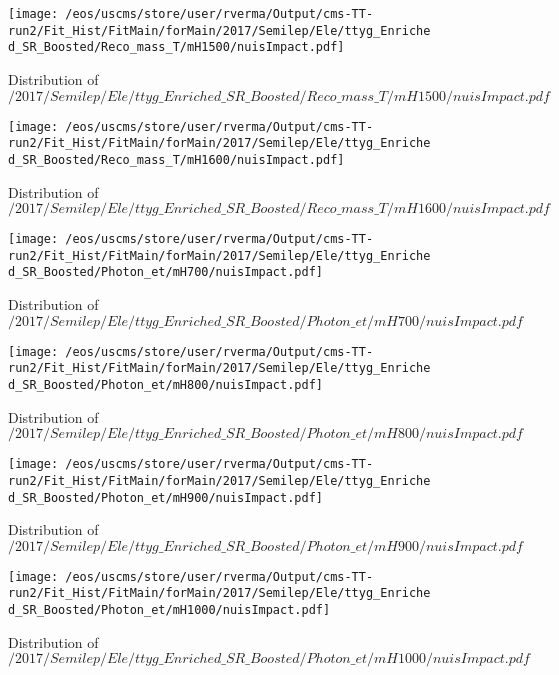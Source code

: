 \begin{figure}
\centering
\texttt{[image: /eos/uscms/store/user/rverma/Output/cms-TT-run2/Fit\_Hist/FitMain/forMain/2017/Semilep/Ele/ttyg\_Enriched\_SR\_Boosted/Reco\_mass\_T/mH1500/nuisImpact.pdf]}
\caption{Distribution of $/2017/Semilep/Ele/ttyg\_Enriched\_SR\_Boosted/Reco\_mass\_T/mH1500/nuisImpact.pdf$}
\end{figure}

\begin{figure}
\centering
\texttt{[image: /eos/uscms/store/user/rverma/Output/cms-TT-run2/Fit\_Hist/FitMain/forMain/2017/Semilep/Ele/ttyg\_Enriched\_SR\_Boosted/Reco\_mass\_T/mH1600/nuisImpact.pdf]}
\caption{Distribution of $/2017/Semilep/Ele/ttyg\_Enriched\_SR\_Boosted/Reco\_mass\_T/mH1600/nuisImpact.pdf$}
\end{figure}

\begin{figure}
\centering
\texttt{[image: /eos/uscms/store/user/rverma/Output/cms-TT-run2/Fit\_Hist/FitMain/forMain/2017/Semilep/Ele/ttyg\_Enriched\_SR\_Boosted/Photon\_et/mH700/nuisImpact.pdf]}
\caption{Distribution of $/2017/Semilep/Ele/ttyg\_Enriched\_SR\_Boosted/Photon\_et/mH700/nuisImpact.pdf$}
\end{figure}

\begin{figure}
\centering
\texttt{[image: /eos/uscms/store/user/rverma/Output/cms-TT-run2/Fit\_Hist/FitMain/forMain/2017/Semilep/Ele/ttyg\_Enriched\_SR\_Boosted/Photon\_et/mH800/nuisImpact.pdf]}
\caption{Distribution of $/2017/Semilep/Ele/ttyg\_Enriched\_SR\_Boosted/Photon\_et/mH800/nuisImpact.pdf$}
\end{figure}

\begin{figure}
\centering
\texttt{[image: /eos/uscms/store/user/rverma/Output/cms-TT-run2/Fit\_Hist/FitMain/forMain/2017/Semilep/Ele/ttyg\_Enriched\_SR\_Boosted/Photon\_et/mH900/nuisImpact.pdf]}
\caption{Distribution of $/2017/Semilep/Ele/ttyg\_Enriched\_SR\_Boosted/Photon\_et/mH900/nuisImpact.pdf$}
\end{figure}

\begin{figure}
\centering
\texttt{[image: /eos/uscms/store/user/rverma/Output/cms-TT-run2/Fit\_Hist/FitMain/forMain/2017/Semilep/Ele/ttyg\_Enriched\_SR\_Boosted/Photon\_et/mH1000/nuisImpact.pdf]}
\caption{Distribution of $/2017/Semilep/Ele/ttyg\_Enriched\_SR\_Boosted/Photon\_et/mH1000/nuisImpact.pdf$}
\end{figure}

